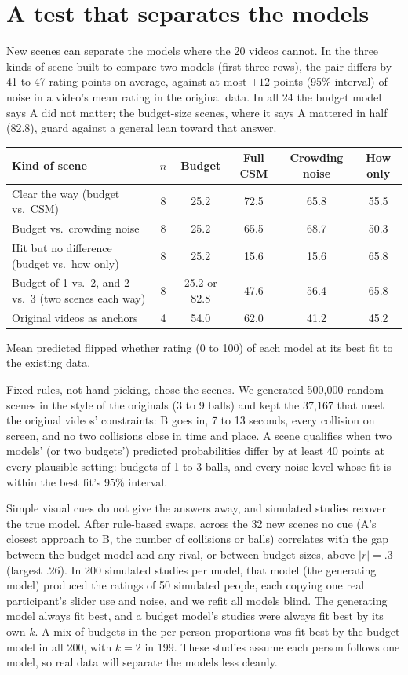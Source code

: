 \section*{A test that separates the models}
New scenes can separate the models where the 20 videos cannot. In the three kinds of scene built to compare two models (first three rows), the pair differs by 41 to 47 rating points on average, against at most $\pm 12$ points (95\% interval) of noise in a video's mean rating in the original data. In all 24 the budget model says A did not matter; the budget-size scenes, where it says A mattered in half (82.8), guard against a general lean toward that answer.

\begin{center}
\small
\begin{tabular}{lccccc}
\toprule
Kind of scene & $n$ & Budget & Full CSM & Crowding noise & How only \\
\midrule
Clear the way (budget vs.\ CSM) & 8 & 25.2 & 72.5 & 65.8 & 55.5 \\
Budget vs.\ crowding noise & 8 & 25.2 & 65.5 & 68.7 & 50.3 \\
Hit but no difference (budget vs.\ how only) & 8 & 25.2 & 15.6 & 15.6 & 65.8 \\
Budget of 1 vs.\ 2, and 2 vs.\ 3 (two scenes each way) & 8 & 25.2 or 82.8 & 47.6 & 56.4 & 65.8 \\
Original videos as anchors & 4 & 54.0 & 62.0 & 41.2 & 45.2 \\
\bottomrule
\end{tabular}

\smallskip
\footnotesize Mean predicted flipped whether rating (0 to 100) of each model at its best fit to the existing data.
\end{center}

Fixed rules, not hand-picking, chose the scenes. We generated 500,000 random scenes in the style of the originals (3 to 9 balls) and kept the 37,167 that meet the original videos' constraints: B goes in, 7 to 13 seconds, every collision on screen, and no two collisions close in time and place. A scene qualifies when two models' (or two budgets') predicted probabilities differ by at least 40 points at every plausible setting: budgets of 1 to 3 balls, and every noise level whose fit is within the best fit's 95\% interval.

Simple visual cues do not give the answers away, and simulated studies recover the true model. After rule-based swaps, across the 32 new scenes no cue (A's closest approach to B, the number of collisions or balls) correlates with the gap between the budget model and any rival, or between budget sizes, above $|r| = .3$ (largest .26). In 200 simulated studies per model, that model (the generating model) produced the ratings of 50 simulated people, each copying one real participant's slider use and noise, and we refit all models blind. The generating model always fit best, and a budget model's studies were always fit best by its own $k$. A mix of budgets in the per-person proportions was fit best by the budget model in all 200, with $k = 2$ in 199. These studies assume each person follows one model, so real data will separate the models less cleanly.

